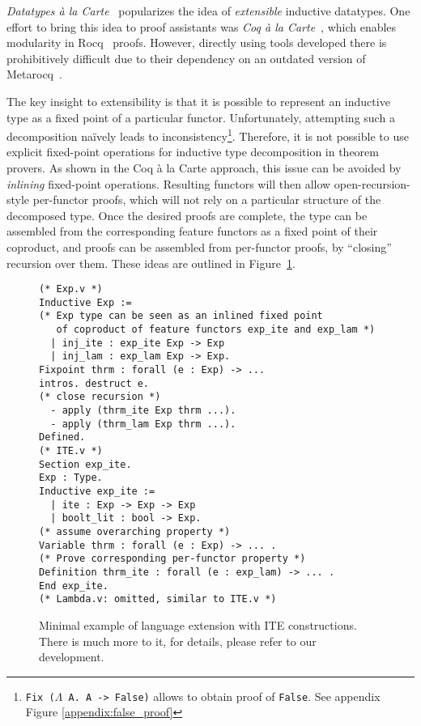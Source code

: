 \documentclass[sigplan,nonacm,review]{acmart}
\begin{document}
\emph{Datatypes à la Carte}~\cite{swierstra2008data}
popularizes the idea of
\emph{extensible} inductive datatypes. 
One effort to bring this idea to proof assistants
was \emph{Coq à la Carte}~\cite{forster2020coq},
which enables modularity in Rocq~\cite{the_coq_development_team_2024_14542673} proofs.
However,
directly using tools developed there
is prohibitively difficult
due to their dependency on an outdated version of Metarocq~\cite{sozeau2020metacoq}.

The key insight to extensibility is that it is possible to represent an inductive type as a fixed point of a particular functor. Unfortunately, attempting such a decomposition na\"ively leads to inconsistency\footnote{\texttt{Fix ($\Lambda$ A. A -> False)} allows to obtain proof of \texttt{False}. See appendix Figure \ref{appendix:false_proof}}. 
Therefore, it is not possible to use explicit fixed-point operations for inductive type decomposition in theorem provers.
As shown in the Coq à la Carte approach,
this issue can be avoided by \emph{inlining} fixed-point operations.  
Resulting functors will then allow open-recursion-style per-functor proofs,
which will not rely on a particular structure of the decomposed type.
Once the desired proofs are complete,
the type can be assembled from the corresponding feature functors as a fixed point of their coproduct,
and proofs can be assembled from
per-functor proofs,
by ``closing'' recursion over them. These ideas are outlined in Figure~\ref{fig:alacart_example}.

\begin{figure}
\begin{lstlisting}[language=Coq]
(* Exp.v *)
Inductive Exp := 
(* Exp type can be seen as an inlined fixed point 
   of coproduct of feature functors exp_ite and exp_lam *)
  | inj_ite : exp_ite Exp -> Exp
  | inj_lam : exp_lam Exp -> Exp.
Fixpoint thrm : forall (e : Exp) -> ...
intros. destruct e.
(* close recursion *)
  - apply (thrm_ite Exp thrm ...).
  - apply (thrm_lam Exp thrm ...).
Defined.
(* ITE.v *)
Section exp_ite.
Exp : Type.
Inductive exp_ite := 
  | ite : Exp -> Exp -> Exp
  | boolt_lit : bool -> Exp.
(* assume overarching property *)
Variable thrm : forall (e : Exp) -> ... .
(* Prove corresponding per-functor property *)
Definition thrm_ite : forall (e : exp_lam) -> ... .
End exp_ite.
(* Lambda.v: omitted, similar to ITE.v *)
\end{lstlisting}
  \caption{Minimal example of language extension with ITE constructions. There is much more to it, for details, please refer to our development.}
  \label{fig:alacart_example}
\end{figure}
\end{document}
